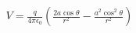 \documentclass[preview]{standalone}
\begin{document}
\begin{align*}
V = \frac{q}{4\pi\epsilon_0} \left( \frac{2a\cos\theta}{r^2} - \frac{a^2\cos^2\theta}{r^2} \right)
\end{align*}
\end{document}
